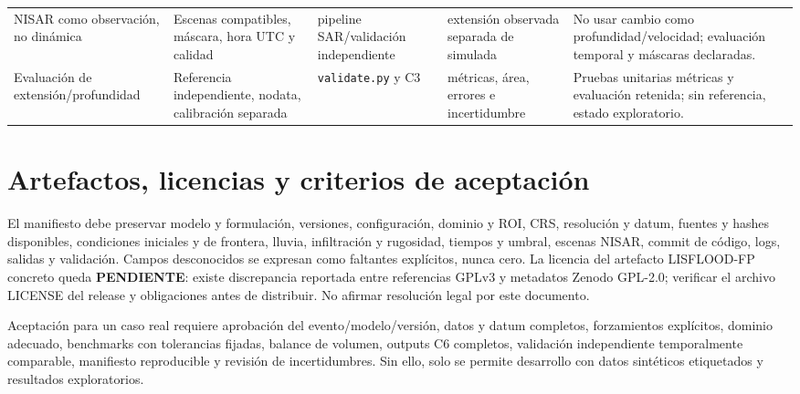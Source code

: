\documentclass[11pt,a4paper]{article}
\newcommand{\pend}{\textbf{PENDIENTE}}
\begin{document}
\begin{landscape}
\begin{longtable}{p{.18\linewidth}p{.18\linewidth}p{.18\linewidth}p{.17\linewidth}p{.22\linewidth}}
NISAR como observación, no dinámica & Escenas compatibles, máscara, hora UTC y calidad & pipeline SAR/validación independiente & extensión observada separada de simulada & No usar cambio como profundidad/velocidad; evaluación temporal y máscaras declaradas.\\
Evaluación de extensión/profundidad & Referencia independiente, nodata, calibración separada & \texttt{validate.py} y C3 & métricas, área, errores e incertidumbre & Pruebas unitarias métricas y evaluación retenida; sin referencia, estado exploratorio.\\
\bottomrule
\end{longtable}
\end{landscape}
\normalsize

\section{Artefactos, licencias y criterios de aceptación}
El manifiesto debe preservar modelo y formulación, versiones, configuración, dominio y ROI, CRS, resolución y datum, fuentes y hashes disponibles, condiciones iniciales y de frontera, lluvia, infiltración y rugosidad, tiempos y umbral, escenas NISAR, commit de código, logs, salidas y validación. Campos desconocidos se expresan como faltantes explícitos, nunca cero. La licencia del artefacto LISFLOOD-FP concreto queda \pend: existe discrepancia reportada entre referencias GPLv3 y metadatos Zenodo GPL-2.0; verificar el archivo LICENSE del release y obligaciones antes de distribuir. No afirmar resolución legal por este documento.

Aceptación para un caso real requiere aprobación del evento/modelo/versión, datos y datum completos, forzamientos explícitos, dominio adecuado, benchmarks con tolerancias fijadas, balance de volumen, outputs C6 completos, validación independiente temporalmente comparable, manifiesto reproducible y revisión de incertidumbres. Sin ello, solo se permite desarrollo con datos sintéticos etiquetados y resultados exploratorios.
\end{document}
